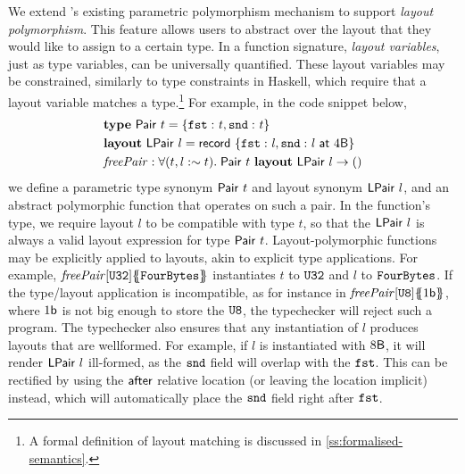 We extend \Cogent's existing parametric polymorphism mechanism to support \emph{layout polymorphism}. This feature allows users to abstract
over the layout that they would like to assign to a certain type.
In a \cogent function signature, \emph{layout variables}, just as type variables, can
be universally quantified. These layout variables may be constrained, similarly to type constraints in Haskell, which require that a layout variable matches a type.\footnote{A formal definition of layout matching is discussed in \autoref{ss:formalised-semantics}.}
For example, in the code snippet below,
\begin{align*}
  & \mathbf{type}\ \Cons{Pair}{t} = \RecordTy{\FieldTy{fst}{\VarN{t}}, \FieldTy{snd}{\VarN{t}}} \\
  & \layout\ \Cons{LPair}{l} = \DLRec{\FieldTy{fst}{\VarN{l}}, \FieldTy{snd}{\VarN{l}\ \at\ 4\byte}}\\
  & \FunN{freePair} : \forall (t, l :\sim t).\; \Cons{Pair}{t}\ \withL{\Cons{LPair}{l}} \rightarrow ()
\end{align*}
we define a parametric type synonym $\mathsf{Pair}\ t$ and layout synonym $\mathsf{LPair}\ l$, and
an abstract polymorphic function that operates on such a pair. In the function's type, we require layout $l$ to be compatible with type $t$, so that the $\mathsf{LPair}\ l$
is always a valid layout expression for type $\mathsf{Pair}\ t$.
Layout-polymorphic functions may be explicitly applied to layouts, akin to explicit type applications.
For example, $\mathit{freePair}[\texttt{U32}]\{\!\!\{\texttt{FourBytes}\}\!\!\}$ instantiates $t$ to $\texttt{U32}$
and $l$ to $\texttt{FourBytes}$. If the type/layout application is
incompatible, as for instance in $\mathit{freePair}[\texttt{U8}]\{\!\!\{1\mathsf{b}\}\!\!\}$, where
$1\mathsf{b}$ is not big enough to store the $\texttt{U8}$, the typechecker will reject
such a program.  The typechecker also ensures that any instantiation of $l$ produces layouts
that are wellformed. For example, if $l$ is instantiated with $8\mathsf{B}$, it will
render $\mathsf{LPair}\ l$ ill-formed, as the $\texttt{snd}$ field will overlap with the
$\texttt{fst}$. This can be rectified by using the $\mathsf{after}$ relative location (or
leaving the location implicit)
instead, which will automatically place the $\texttt{snd}$ field right after $\texttt{fst}$.

